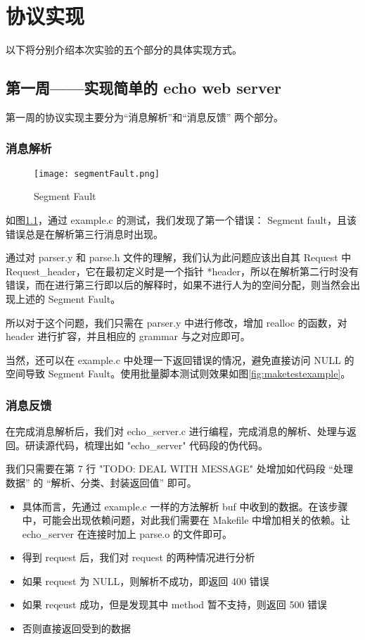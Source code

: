 \chapter{协议实现}

以下将分别介绍本次实验的五个部分的具体实现方式。

\section{第一周——实现简单的 echo web server}

第一周的协议实现主要分为“消息解析”和“消息反馈” 两个部分。

\subsection{消息解析}

\begin{figure}[htbp!]
    \centering
    \texttt{[image: segmentFault.png]}
    \caption{Segment Fault}\label{fig:segmentfault}
    \vspace{-1em}
\end{figure}

如图\ref{fig:segmentfault}，通过 example.c 的测试，我们发现了第一个错误： Segment fault，且该错误总是在解析第三行消息时出现。

通过对 parser.y 和 parse.h 文件的理解，我们认为此问题应该出自其 Request 中 Request\_header，它在最初定义时是一个指针 *header，所以在解析第二行时没有错误，而在进行第三行即以后的解释时，如果不进行人为的空间分配，则当然会出现上述的 Segment Fault。

所以对于这个问题，我们只需在 parser.y 中进行修改，增加 realloc 的函数，对 header 进行扩容，并且相应的 grammar 与之对应即可。

当然，还可以在 example.c 中处理一下返回错误的情况，避免直接访问 NULL 的空间导致 Segment Fault。使用批量脚本测试则效果如图\ref{fig:maketestexample}。


\subsection{消息反馈}

在完成消息解析后，我们对 echo\_server.c 进行编程，完成消息的解析、处理与返回。研读源代码，梳理出如 "echo\_server" 代码段的伪代码。

我们只需要在第 7 行 "TODO: DEAL WITH MESSAGE" 处增加如代码段 “处理数据” 的 “解析、分类、封装返回值” 即可。

\begin{itemize}
    \item 具体而言，先通过 example.c 一样的方法解析 buf 中收到的数据。在该步骤中，可能会出现依赖问题，对此我们需要在 Makefile 中增加相关的依赖。让 echo\_server 在连接时加上 parse.o 的文件即可。
    \item 得到 request 后，我们对 request 的两种情况进行分析
    \item 如果 request 为 NULL，则解析不成功，即返回 400 错误
    \item 如果 reqeust 成功，但是发现其中 method 暂不支持，则返回 500 错误
    \item 否则直接返回受到的数据
\end{itemize}

